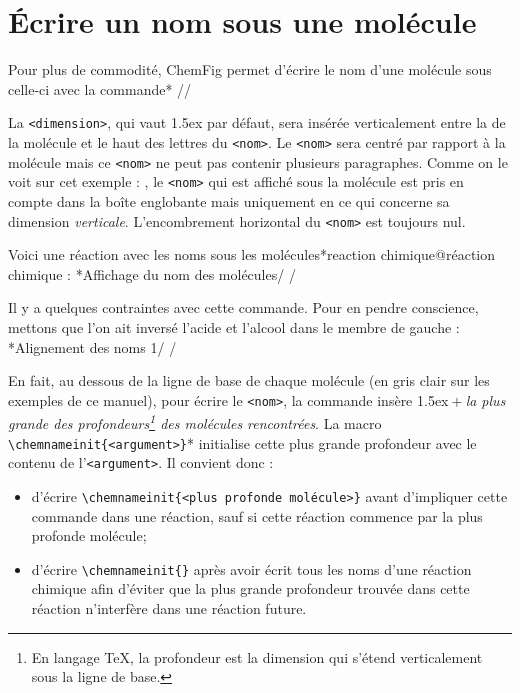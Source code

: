 \documentclass[10pt]{article}
\makeatletter
\newcommand\idx{\@ifstar{\let\print@or@not\@gobble\idx@}{\let\print@or@not\@firstofone\idx@}}
\newcommand\idx@[1]{%
	\ifcat\expandafter\noexpand\@car#1\@nil\relax%
		\expandafter\ifx\@car#1\@nil\protect
			\index{#1}%
			\print@or@not{#1}%
		\else
			\saveexpandmode\expandarg
			\StrSubstitute{\string#1}{\string @}{\@empty\protect\symbol{'100}}[\temp@]%
			\StrGobbleLeft\temp@1[\temp@]%
			\restoreexpandmode
			\expandafter\index\expandafter{\temp@ @\protect\texttt{\protect\textbackslash\temp@}}%
			\print@or@not{\texttt{\string#1}}%
		\fi
	\else
		\index{#1}%
		\print@or@not{#1}%
	\fi
}
\newcommand\make@car@active[1]{%
	\catcode`#1\active
	\begingroup
		\lccode`\~`#1\relax
		\lowercase{\endgroup\def~}%
}
\newif\if@exstar
\newcommand\exemple{%
	\begingroup
	\parskip\z@
	\@makeother\;\@makeother\!\@makeother\?\@makeother\:%
	\@ifstar{\@exstartrue\exemple@}{\@exstarfalse\exemple@}}
\newcommand\exemple@[2][65]{%
	\medbreak\noindent
	\begingroup
		\let\do\@makeother\dospecials
		\make@car@active\ { {}}%
		\make@car@active\^^M{\par\leavevmode}%
		\make@car@active\,{\leavevmode\kern\z@\string,}%
		\make@car@active\-{\leavevmode\kern\z@\string-}%
		\make@car@active\>{\leavevmode\kern\z@\string>}%
		\make@car@active\<{\leavevmode\kern\z@\string<}%
		\exemple@@{#1}{#2}%
}
\newcommand\exemple@@[3]{%
	\def\@tempa##1#3{\exemple@@@{#1}{#2}{##1}}%
	\@tempa
}
\newcommand\exemple@@@[3]{%
	\xdef\the@code{#3}%
	\endgroup
	\if@exstar
		\begingroup
			\fboxrule0.4pt
			\let\breakboxparindent\z@
			\def\bkvz@bottom{\hrule\@height\fboxrule}%
			\let\bkvz@before@breakbox\relax
			\def\bkvz@set@linewidth{\advance\linewidth\dimexpr-2\fboxrule-2\fboxsep}%
			\def\bkvz@left{\vrule\@width\fboxrule\hskip\fboxsep}%
			\def\bkvz@right{\hskip\fboxsep\vrule\@width\fboxrule}%
			\def\bkvz@top{\hbox to \hsize{%
				\vrule\@width\fboxrule\@height\fboxrule
				\leaders\bkvz@bottom\hfill
				\ECFAugie
				\fboxsep\z@
				\colorbox{black}{\kern0.25em\color{white}\footnotesize\lower0.5ex\hbox{\strut#2}\kern0.25em}%
				\leaders\bkvz@bottom\hfill
				\vrule\@width\fboxrule\@height\fboxrule}}%
			\breakbox
				\kern.5ex\relax
				\ttfamily\footnotesize\the@code\par
				\normalfont
				\kern3pt
				\hrule height0.1pt width\linewidth depth0.1pt
				\vskip5pt
				\rightskip0pt plus 1fill
				\everypar{{\color{lightgray}\rlap{\vrule height0.1pt width\linewidth depth0.1pt}}\hskip0pt plus 1fill}%
				\newlinechar`\^^M\everyeof{\noexpand}\scantokens{#3}\par
			\endbreakbox
		\endgroup
	\else
		\vskip0.5ex
		\boxput*(0,1)
			{\fboxsep\z@
			\hbox{\ECFAugie\colorbox{black}{\leavevmode\kern0.25em{\color{white}\footnotesize\strut#2}\kern0.25em}}%
			}%
			{\fboxsep5pt
			\fbox{%
				$\vcenter{\hsize\dimexpr0.#1\linewidth-\fboxsep-\fboxrule\relax
					\kern5pt\parskip0pt \ttfamily\footnotesize\the@code}%
				\vcenter{\kern5pt\hsize\dimexpr\linewidth-0.#1\linewidth-\fboxsep-\fboxrule\relax
					\everypar{{\color{lightgray}\rlap{\vrule height0.1pt width\dimexpr\linewidth-0.#1\linewidth-\fboxsep-\fboxrule depth0.1pt}}}%
					\footnotesize\newlinechar`\^^M\everyeof{\noexpand}\scantokens{#3}}$%
				}%
			}%
	\fi
	\medbreak
	\endgroup
}
\let\do\@makeother\dospecials
\newcommand\CF{{\ECFAugie ChemFig}\xspace}
\makeatother
\begin{document}
\section{Écrire un nom sous une molécule}\label{chemname}
Pour plus de commodité, \CF permet d'écrire le nom d'une molécule sous celle-ci avec la commande\idx*\chemname
\centerverb//
\smallskip

La \verb-<dimension>-, qui vaut 1.5ex par défaut, sera insérée verticalement entre la \idx{ligne de base} de la molécule et le haut des lettres du \verb-<nom>-. Le \verb-<nom>- sera centré par rapport à la molécule mais ce \verb-<nom>- ne peut pas contenir plusieurs paragraphes. Comme on le voit sur cet exemple : , le \verb-<nom>- qui est affiché sous la molécule est pris en compte dans la boîte englobante mais uniquement en ce qui concerne sa dimension \emph{verticale}. L'encombrement horizontal du \verb-<nom>- est toujours nul.

Voici une réaction avec les noms sous les molécules\idx*{reaction chimique@réaction chimique} :
\exemple*{Affichage du nom des molécules}/
\chemsign{+}
\chemrel{->}
\chemsign{+}
/

Il y a quelques contraintes avec cette commande. Pour en pendre conscience, mettons que l'on ait inversé l'acide et l'alcool dans le membre de gauche :
\exemple*{Alignement des noms 1}/
\chemsign{+}
\chemrel{->}
\chemsign{+}
/

En fait, au dessous de la ligne de base de chaque molécule (en gris clair sur les exemples de ce manuel), pour écrire le \verb-<nom>-, la commande \idx{\chemname} insère 1.5ex${}+{}$\emph{la plus grande des profondeurs\footnote{En langage \TeX{}, la profondeur est la dimension qui s'étend verticalement sous la ligne de base.} des molécules rencontrées}. \label{chemnameinit}La macro \verb-\chemnameinit{<argument>}-\idx*{\chemnameinit} initialise cette plus grande profondeur avec le contenu de l'\verb-<argument>-. Il convient donc :
\begin{itemize}
	\item d'écrire \verb-\chemnameinit{<plus profonde molécule>}- avant d'impliquer cette commande dans une réaction, sauf si cette réaction commence par la plus profonde molécule;
	\item d'écrire \verb-\chemnameinit{}- après avoir écrit tous les noms d'une réaction chimique afin d'éviter que la plus grande profondeur trouvée dans cette réaction n'interfère dans une réaction future.
\end{itemize}
\end{document}
